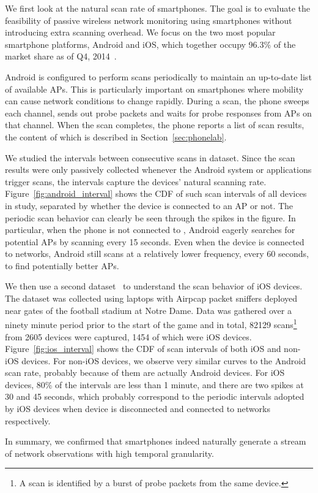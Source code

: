 We first look at the natural \wifi{} scan rate of smartphones. The goal is to
evaluate the feasibility of passive wireless network monitoring using
smartphones without introducing extra scanning overhead. We focus on the two
most popular smartphone platforms, Android and iOS, which together occupy 96.3\%
of the market share as of Q4, 2014~\cite{smartphone-market-share}.

Android is configured to perform \wifi{} scans periodically to maintain an
up-to-date list of available APs. This is particularly important on smartphones
where mobility can cause network conditions to change rapidly. During a scan,
the phone sweeps each \wifi{} channel, sends out probe packets and waits for
probe responses from APs on that channel. When the scan completes, the phone
reports a list of scan results, the content of which is described in
Section~\ref{sec:phonelab}.

We studied the intervals between consecutive scans in \ubscan{} dataset. Since
the scan results were only passively collected whenever the Android system or
applications trigger scans, the intervals capture the devices' natural scanning
rate. Figure~\ref{fig:android_interval} shows the CDF of such scan intervals of
all devices in study, separated by whether the device is connected to an AP or
not. The periodic scan behavior can clearly be seen through the spikes in the
figure. In particular, when the phone is not connected to \wifi{}, Android
eagerly searches for potential APs by scanning every 15 seconds. Even when the
device is connected to \wifi{} networks, Android still scans at a relatively
lower frequency, every 60 seconds, to find potentially better APs.

We then use a second dataset~\cite{hu2015there} to understand the scan
behavior of iOS devices. The dataset was collected using laptops with Airpcap
packet sniffers deployed near gates of the football stadium at Notre Dame.  Data
was gathered over a ninety minute period prior to the start of the game and in
total, \num{82129} scans\footnote{A scan is identified by a burst of probe
packets from the same device.} from 2605 devices were captured, 1454 of which
were iOS devices. Figure~\ref{fig:ios_interval} shows the CDF of scan intervals
of both iOS and non-iOS devices. For non-iOS devices, we observe very similar
curves to the Android scan rate, probably because of them are actually Android
devices. For iOS devices, 80\% of the intervals are less than 1 minute, and
there are two spikes at 30 and 45 seconds, which probably correspond to the
periodic intervals adopted by iOS devices when device is disconnected and
connected to \wifi{} networks respectively.  

In summary, we confirmed that smartphones indeed naturally generate a stream of
network observations with high temporal granularity.
